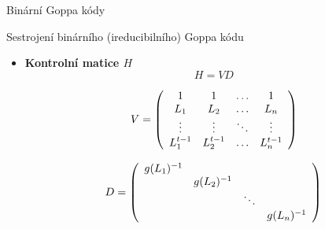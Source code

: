 \documentclass{beamer}
\begin{document}
\begin{frame}{Binární Goppa kódy}

    \begin{block}{Sestrojení binárního (ireducibilního) Goppa kódu}
        \begin{itemize}

            \item \textbf{Kontrolní matice $H$} \\
                $$ H = V D $$

            \pause
                $$
                    V = \left(\begin{array}{c c c c}
                        1         & 1         & \ldots & 1         \\
                        L_1       & L_2       & \ldots & L_n       \\
                        \vdots    & \vdots    & \ddots & \vdots    \\
                        L_1^{t-1} & L_2^{t-1} & \ldots & L_n^{t-1} \\
                    \end{array}\right)
                $$

            \pause
                $$
                    D = \left(\begin{array}{c c c c}
                        g(L_1)^{-1} &             &        &             \\
                                    & g(L_2)^{-1} &        &             \\
                                    &             & \ddots &             \\
                                    &             &        & g(L_n)^{-1} \\
                    \end{array}\right)
                $$

        \end{itemize}
    \end{block}

\end{frame}


\end{document}
